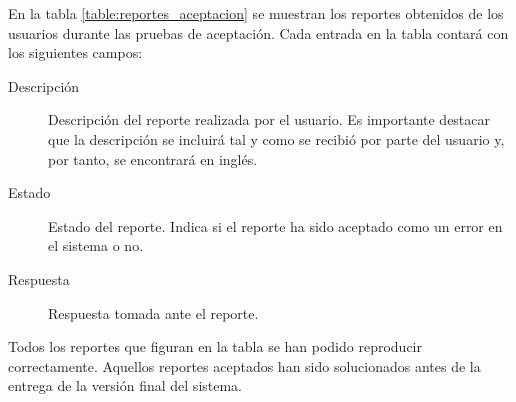 En la tabla \ref{table:reportes_aceptacion} se muestran los reportes obtenidos de
los usuarios durante las pruebas de aceptación.  Cada entrada en la tabla contará
con los siguientes campos:
\begin{description}
	\item[Descripción] Descripción del reporte realizada por el usuario.  Es importante
		destacar que la descripción se incluirá tal y como se recibió por parte
		del usuario y, por tanto, se encontrará en inglés.
	\item[Estado] Estado del reporte.  Indica si el reporte ha sido aceptado como
		un error en el sistema o no.
	\item[Respuesta]  Respuesta tomada ante el reporte.
\end{description}

Todos los reportes que figuran en la tabla se han podido reproducir correctamente.
Aquellos reportes aceptados han sido solucionados antes de la entrega de la versión
final del sistema.

